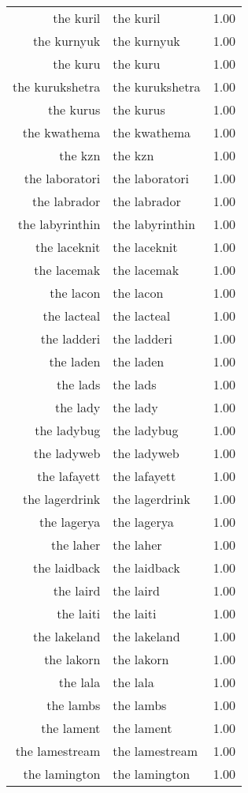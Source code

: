 \begin{table}[ht]
\begin{tabular}{rlr}
  the kuril & the kuril & 1.00 \\ 
  the kurnyuk & the kurnyuk & 1.00 \\ 
  the kuru & the kuru & 1.00 \\ 
  the kurukshetra & the kurukshetra & 1.00 \\ 
  the kurus & the kurus & 1.00 \\ 
  the kwathema & the kwathema & 1.00 \\ 
  the kzn & the kzn & 1.00 \\ 
  the laboratori & the laboratori & 1.00 \\ 
  the labrador & the labrador & 1.00 \\ 
  the labyrinthin & the labyrinthin & 1.00 \\ 
  the laceknit & the laceknit & 1.00 \\ 
  the lacemak & the lacemak & 1.00 \\ 
  the lacon & the lacon & 1.00 \\ 
  the lacteal & the lacteal & 1.00 \\ 
  the ladderi & the ladderi & 1.00 \\ 
  the laden & the laden & 1.00 \\ 
  the lads & the lads & 1.00 \\ 
  the lady & the lady & 1.00 \\ 
  the ladybug & the ladybug & 1.00 \\ 
  the ladyweb & the ladyweb & 1.00 \\ 
  the lafayett & the lafayett & 1.00 \\ 
  the lagerdrink & the lagerdrink & 1.00 \\ 
  the lagerya & the lagerya & 1.00 \\ 
  the laher & the laher & 1.00 \\ 
  the laidback & the laidback & 1.00 \\ 
  the laird & the laird & 1.00 \\ 
  the laiti & the laiti & 1.00 \\ 
  the lakeland & the lakeland & 1.00 \\ 
  the lakorn & the lakorn & 1.00 \\ 
  the lala & the lala & 1.00 \\ 
  the lambs & the lambs & 1.00 \\ 
  the lament & the lament & 1.00 \\ 
  the lamestream & the lamestream & 1.00 \\ 
  the lamington & the lamington & 1.00 \\ 

\end{tabular}
\end{table}
